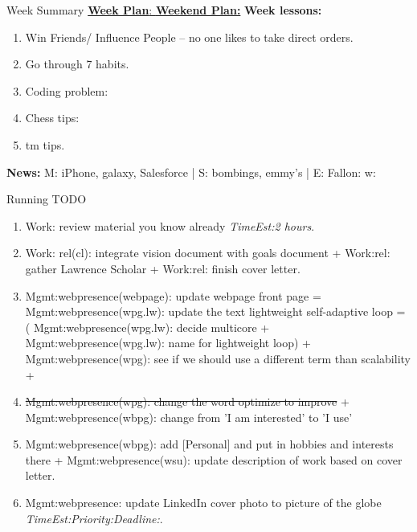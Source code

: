 \documentclass[serif, mathserif, final]{beamer}
\newcommand{\doneTask}[1]{\tiny \item \tiny \sout{#1}}
\newcommand{\te}[1]{\textit{TimeEst:}\textit{#1}}
\newcommand{\dl}[1]{\textit{Deadline:}\textit{#1}}
\newcommand{\pr}[1]{\textit{Priority:}\textit{#1}}
\begin{document}
\begin{frame}
\begin{columns}
\begin{column}{0.5\linewidth}       \begin{block}{Week Summary} 
        {\tiny \underline{\textbf{Week Plan}: } \tiny } 
        {\tiny \underline{\textbf{Weekend Plan:}} }
        {\tiny {\bf Week lessons:}}
        \begin{enumerate}
          \tiny \item \tiny Win Friends/ Influence People – no one
          likes to take direct orders.
        \item \tiny Go through 7 habits.
        \item \tiny Coding problem: 
        \item \tiny Chess tips: 
        \item \tiny tm tips.
        \end{enumerate}         
        {{\tiny \bf News:} M: iPhone, galaxy, Salesforce | S: bombings, emmy's | E: Fallon:  w:  }
        
      \begin{block}{Running TODO} %
        \begin{enumerate} 
          
     
\tiny  \item \tiny Work: review material you know already \te{2
        hours}. 

      \item \tiny Work: rel(cl): integrate vision document with goals
        document + Work:rel: gather Lawrence Scholar +  Work:rel:
        finish cover letter. 
      \item \tiny Mgmt:webpresence(webpage): update webpage front page =
        Mgmt:webpresence(wpg.lw): update the text lightweight self-adaptive
        loop = ( Mgmt:webpresence(wpg.lw): decide multicore +
        Mgmt:webpresence(wpg.lw): name for lightweight loop) + Mgmt:webpresence(wpg): see if we should use a different term
        than scalability  + \doneTask{Mgmt:webpresence(wpg): change
          the word optimize to improve}  + Mgmt:webpresence(wbpg): change from 'I am
        interested' to 'I use' 
      \item \tiny Mgmt:webpresence(wbpg): add [Personal] and put in
        hobbies and interests there  + Mgmt:webpresence(wsu): update description of work based on cover
        letter. 
        
      \item \tiny Mgmt:webpresence: update LinkedIn cover photo to
        picture of the globe \te{}\pr{}\dl{}. 


\end{enumerate}
\end{block}
\end{block}
\end{column}
\end{columns}
\end{frame}
\end{document}
